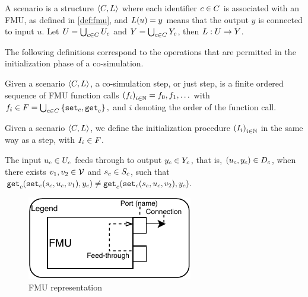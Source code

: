 \documentclass[runningheads]{llncs}
\begin{document}
\begin{definition}[Scenario]\label{def:cosim_scenario}
  A scenario is a structure $ \left\langle C, L \right\rangle $ where each identifier $c \in C$ is associated with an FMU, as defined in \ref{def:fmu}, and $L(u)=y$ means that the output $y$ is connected to input $u$.
  Let $U = \bigcup_{c \in C} U_{c}$ and $Y = \bigcup_{c \in C} Y_{c}$, then $L : U \to Y$.
\end{definition}

The following definitions correspond to the operations that are permitted in the initialization phase of a co-simulation.

\begin{definition}[Step]\label{def:cosim_step}
  Given a scenario $ \left\langle C, L \right\rangle $, a co-simulation step, or just step, is a finite ordered sequence of FMU function calls $ \left( f_i \right)_{i \in \mathbb{N}} = f_0, f_1, \ldots$ with
  $f_i \in F = \bigcup_{c \in C}  \left\{ \mathtt{set}_{c},\mathtt{get}_{c} \right\},$
  and $i$ denoting the order of the function call.
\end{definition}

\begin{definition}[Initialization]\label{def:initialization}
  Given a scenario $ \left\langle C, L \right\rangle $, we define the initialization procedure $ \left( I_i \right)_{i \in \mathbb{N}}$ in the same way as a step, with $I_i \in F$.
\end{definition}

\begin{definition}\label{def:feedthrough}
  The input $u_{c} \in U_{c}$ feeds through to output $y_{c} \in Y_{c}$, that is, $(u_{c},y_{c}) \in D_{c}$, when there exists $v_1, v_2 \in \mathcal{V}$ and $s_{c} \in S_{c}$, such that
  $
  \mathtt{get}_{c} (\mathtt{set}_{c}(s_{c}, u_{c}, v_1), y_{c}) \neq \mathtt{get}_{c} (\mathtt{set}_{c}(s_{c}, u_{c}, v_2), y_{c}).
  $
\end{definition}

\begin{figure}
    \centering
    \includegraphics{images/FMU_legendpdf.pdf}
    \caption{FMU representation}
    \label{fig:fmu_legend}
\end{figure}
\end{document}
